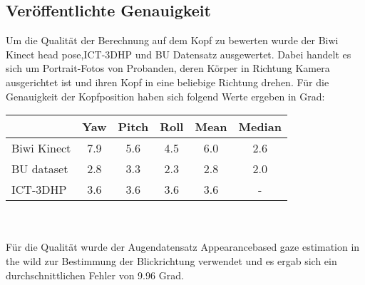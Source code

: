 \subsection{Veröffentlichte Genauigkeit}
Um die Qualität der Berechnung auf dem Kopf zu bewerten wurde der \glqq Biwi Kinect head pose\grqq \cite{BIWI_database},\glqq ICT-3DHP\grqq \cite{ICT_database} und \glqq BU Datensatz\grqq \cite{BU_database} ausgewertet. Dabei handelt es sich um Portrait-Fotos von Probanden, deren Körper in Richtung Kamera ausgerichtet ist und ihren Kopf in eine beliebige Richtung drehen. Für die Genauigkeit der Kopfposition haben sich folgend Werte ergeben in Grad:\\
\begin{tabular}{|l|c|c|c||c|c|}
	\hline
	&Yaw&Pitch&Roll&Mean&Median\\\hline
	Biwi Kinect&7.9&5.6&4.5&6.0&2.6\\\hline
	BU dataset&2.8&3.3&2.3&2.8&2.0\\\hline
	ICT-3DHP&3.6&3.6&3.6&3.6&-\\\hline
\end{tabular}\\\\
Für die Qualität wurde der Augendatensatz \glqq Appearancebased
gaze estimation in the wild\grqq \cite{database_Eye_old} zur Bestimmung der Blickrichtung verwendet und es ergab sich ein durchschnittlichen Fehler von 9.96 Grad.